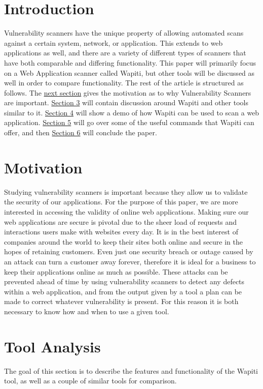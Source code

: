\section{Introduction}
\quad \quad Vulnerability scanners have the unique property of allowing automated scans against a certain system, 
network, or application. This extends to web applications as well, and there are a variety of different types of scanners 
that have both comparable and differing functionality. This paper will primarily focus on a Web Application
scanner called Wapiti, but other tools will be discussed as well in order to compare functionality. The rest of
the article is structured as follows. The \hyperref[sec:motive]{next section} gives the motivation as to why
Vulnerability Scanners are important. \hyperref[sec:tools]{Section 3} will contain discussion around Wapiti and other tools similar to it.
\hyperref[sec:demo]{Section 4} will show a demo of how Wapiti can be used to scan a web application. 
\hyperref[sec:opts]{Section 5} will go over some of the useful commands that Wapiti can offer, and then \hyperref[sec:conclude]{Section 6} will conclude the paper.
\section{Motivation} \label{sec:motive}
\quad \quad Studying vulnerability scanners is important because they allow us to validate the security of our applications. 
For the purpose of this paper, we are more interested in accessing the validity of online web applications. Making sure 
our web applications are secure is pivotal due to the sheer load of requests and interactions users make with websites
every day. It is in the best interest of companies around the world to keep their sites both online and secure in the hopes
of retaining customers. Even just one security breach or outage caused by an attack can turn a customer away forever, 
therefore it is ideal for a business to keep their applications online as much as possible. These attacks can be prevented ahead of time
by using vulnerability scanners to detect any defects within a web application, and from the output given by a tool
a plan can be made to correct whatever vulnerability is present. For this reason it is both necessary to know how and when 
to use a given tool.
\section{Tool Analysis} \label{sec:tools}
\quad \quad The goal of this section is to describe the features and functionality of the Wapiti tool, as well as a couple of
similar tools for comparison.
